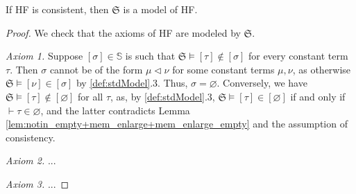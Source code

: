 \begin{theorem}
    \label{thm:stdModel.model_of_consistent}
    \leanok
    If HF is consistent, then $\mathfrak{S}$ is a model of HF.
\end{theorem}

\begin{proof}
    We check that the axioms of HF are modeled by $\mathfrak{S}$.

    \textit{Axiom 1.} Suppose $[\sigma] \in \mathbb{S}$ is such that 
    $\mathfrak{S} \vDash [\tau] \notin [\sigma]$ for every constant term $\tau$.
    Then $\sigma$ cannot be of the form $\mu \lhd \nu$ for some constant terms $\mu, \nu$,
    as otherwise $\mathfrak{S} \vDash [\nu] \in [\sigma]$ by \ref{def:stdModel}.3.
    Thus, $\sigma = \varnothing$.
    Conversely, we have $\mathfrak{S} \vDash [\tau] \notin [\varnothing]$ for all $\tau$,
    as, by \ref{def:stdModel}.3, $\mathfrak{S} \vDash [\tau] \in [\varnothing]$ if and only if
    $\vdash \tau \in \varnothing$, and the latter contradicts 
    Lemma \ref{lem:notin_empty+mem_enlarge+mem_enlarge_empty} and the assumption of consistency.

    \textit{Axiom 2.} ...

    \textit{Axiom 3.} ...

\end{proof}